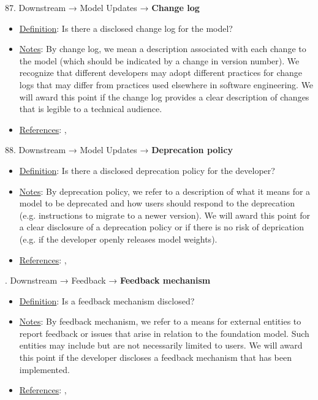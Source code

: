 87. Downstream → Model Updates → \textbf{Change log}
\vspace{-\parskip}
\begin{itemize}
	\item
	\underline{Definition}: Is there a disclosed change log for the model?
	\item
	\underline{Notes}: By change log, we mean a description associated with each change to the model (which should be indicated by a change in version number). We recognize that different developers may adopt different practices for change logs that may differ from practices used elsewhere in software engineering. We will award this point if the change log provides a clear description of changes that is legible to a technical audience.
	\item
	\underline{References}: \citet{chen2023chatgpts}, \citet{li2016watch}
\end{itemize} \vspace{\baselineskip}


88. Downstream → Model Updates → \textbf{Deprecation policy}
\vspace{-\parskip}
\begin{itemize}
	\item
	\underline{Definition}: Is there a disclosed deprecation policy for the developer?
	\item
	\underline{Notes}: By deprecation policy, we refer to a description of what it means for a model to be deprecated and how users should respond to the deprecation (e.g. instructions to migrate to a newer version). We will award this point for a clear disclosure of a deprecation policy or if there is no risk of deprication (e.g. if the developer openly releases model weights).
	\item
	\underline{References}: \citet{chen2023chatgpts}, \citet{haryono2020automatic}
\end{itemize} \vspace{\baselineskip}


. Downstream → Feedback → \textbf{Feedback mechanism}
\vspace{-\parskip}
\begin{itemize}
	\item
	\underline{Definition}: Is a feedback mechanism disclosed?
	\item
	\underline{Notes}: By feedback mechanism, we refer to a means for external entities to report feedback or issues that arise in relation to the foundation model. Such entities may include but are not necessarily limited to users. We will award this point if the developer discloses a feedback mechanism that has been implemented.
	\item
	\underline{References}: \citet{bommasani2023ecosystem}, \citet{raji2022audit}
\end{itemize} \vspace{\baselineskip}


